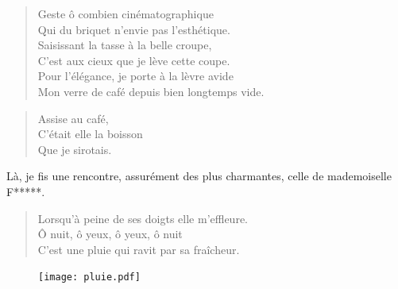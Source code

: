 \begin{verse}\sizain
  Geste ô combien cinématographique\\   %
  Qui du briquet n’envie pas l’esthétique.\\   %
  Saisissant la tasse à la belle croupe,\\   %
  C’est aux cieux que je lève cette coupe.\\   %
  Pour l’élégance, je porte à la lèvre avide\\   %
  Mon verre de café depuis bien longtemps vide. 
\end{verse}

\begin{verse}\haiku
  Assise au café,\\  %
  C’était elle la boisson\\  %
  Que je sirotais.
\end{verse}

\begin{prose}
Là, je fis une rencontre, assurément des plus charmantes, celle de mademoiselle F*****.
\end{prose}



\begin{verse}\tercet
  Lorsqu’à peine de ses doigts elle m’effleure.\\   %
  Ô nuit, ô yeux, ô yeux, ô nuit\\   %
  C’est une pluie qui ravit par sa fraîcheur. 
\end{verse}

\begin{figure}[h]
\centering
\texttt{[image: pluie.pdf]}
\captionsetup{labelformat=empty}
\caption[Idéotexte de la ]{}
\end{figure}


